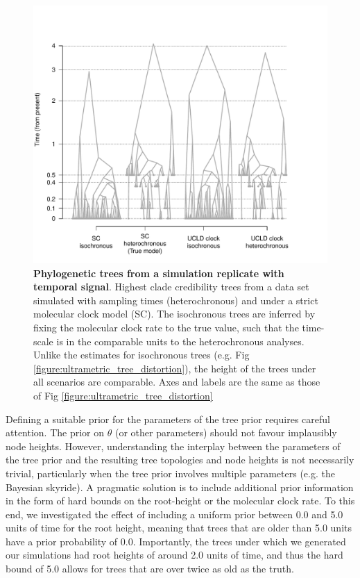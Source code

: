 \documentclass[10pt,letterpaper]{article}
\begin{document}
\begin{figure}[!h]
	\begin{center}
		\includegraphics[width=15cm]{sandbox_figures/tree_distortion_heterochronous.pdf}\newline
		\vspace{-0.5cm}
		\caption{\textbf{Phylogenetic trees from a simulation replicate with temporal signal}. Highest clade credibility trees from a data set simulated with sampling times (heterochronous) and under a strict molecular clock model (SC). The isochronous trees are inferred by fixing the molecular clock rate to the true value, such that the time-scale is in the comparable units to the heterochronous analyses. Unlike the estimates for isochronous trees (e.g. Fig \ref{figure:ultrametric_tree_distortion}), the height of the trees  under all scenarios are comparable. Axes and labels are the same as those of Fig \ref{figure:ultrametric_tree_distortion}}
		\label{figure:heterochronous_tree_distortion}
	\end{center}
\end{figure}

Defining a suitable prior for the parameters of the tree prior requires careful attention. The prior on $\theta$ (or other parameters) should not favour implausibly node heights. However, understanding the interplay between the parameters of the tree prior and the resulting tree topologies and node heights is not necessarily trivial, particularly when the tree prior involves multiple parameters (e.g. the Bayesian skyride). A pragmatic solution is to include additional prior information in the form of hard bounds on the root-height or the molecular clock rate. To this end, we investigated the effect of including a uniform prior between 0.0 and 5.0 units of time for the root height, meaning that trees that are older than 5.0 units have a prior probability of 0.0. Importantly, the trees under which we generated our simulations had root heights of around 2.0 units of time, and thus the hard bound of 5.0 allows for trees that are over twice as old as the truth. 
\end{document}
